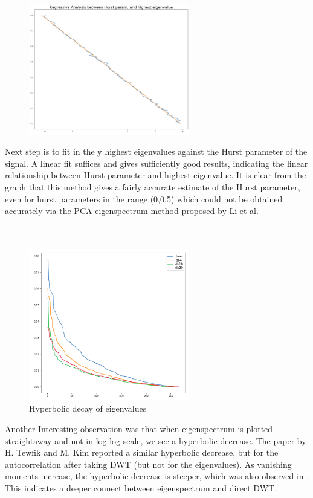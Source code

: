\documentclass[a4paper]{article}
\begin{document}
\begin{figure}
\vspace{-30pt}
\includegraphics[width=7cm]{dwt_lin.png}
\vspace{-30pt}
\end{figure} 
Next step is to fit in the y highest eigenvalues against the Hurst parameter of the signal. A linear fit suffices and gives sufficiently good results, indicating the linear relationship between Hurst parameter and highest eigenvalue.  It is clear from the graph that this method gives a fairly accurate estimate of the Hurst parameter, even for hurst parameters in the range (0,0.5) which could not be obtained accurately via the PCA eigenspectrum method proposed by Li et al.
\\
\\
\\

\begin{figure}
\vspace{-30pt}
\includegraphics[width=7cm]{hyp.png}
\caption{Hyperbolic decay of eigenvalues\\}
\vspace{-30pt}
\end{figure}
Another Interesting observation was that when eigenspectrum is plotted straightaway and not in log log scale, we see a hyperbolic decrease. The paper by H. Tewfik and M. Kim\cite{DBLP:journals/tit/TewfikK92} reported a similar hyperbolic decrease, but for the autocorrelation after taking DWT (but not for the eigenvalues). As vanishing moments increase, the hyperbolic decrease is steeper, which was also observed in \cite{DBLP:journals/tit/TewfikK92}. This indicates a deeper connect between eigenspectrum and direct DWT.\\ \\ \\
\end{document}

